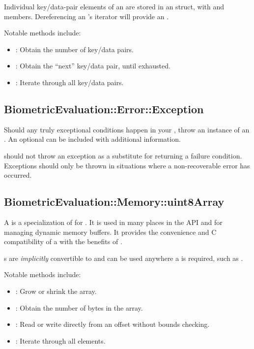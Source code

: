 Individual key/data-pair elements of an  are stored in an
 struct, with  and  members.
Dereferencing an 's iterator will provide an
.

Notable methods include:
\begin{itemize}
	\item {}: Obtain the number of key/data pairs.
	\item {}: Obtain the ``next'' key/data pair, until
	exhausted.
	\item {}: Iterate through all key/data pairs.
\end{itemize}

\subsection{BiometricEvaluation::Error::Exception}

\large{}

Should any truly exceptional conditions happen in your \implementation, throw
an instance of an . An optional  can
be included with additional information.

\implementations should not throw an exception as a substitute for returning a
failure condition. Exceptions should only be thrown in situations where a
non-recoverable error has occurred.

\subsection{BiometricEvaluation::Memory::uint8Array}

\large{}

A  is a specialization of  for
. It is used in many places in the API and  for managing dynamic memory buffers. It provides the
convenience and C compatibility of a  with the benefits of
.

s are \textit{implicitly} convertible to  and
can be used anywhere a  is required, such as .

Notable methods include:
\begin{itemize}
	\item {}: Grow or shrink the array.
	\item {}: Obtain the number of bytes in the array.
	\item {}: Read or write directly from an offset without
	bounds checking.
	\item {}: Iterate through all elements.
\end{itemize}

